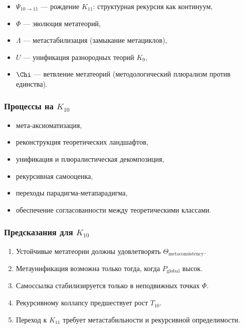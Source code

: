 \begin{itemize}
    \item $\Psi_{10\to11}$ — рождение $K_{11}$: структурная рекурсия как континуум,
    \item $\Phi$ — эволюция метатеорий,
    \item $\Lambda$ — метастабилизация (замыкание метациклов),
    \item $U$ — унификация разнородных теорий $K_9$,
    \item $\Chi$ — ветвление метатеорий (методологический плюрализм против единства).
\end{itemize}

\subsubsection{Процессы на $K_{10}$}

\begin{itemize}
    \item мета-аксиоматизация,
    \item реконструкция теоретических ландшафтов,
    \item унификация и плюралистическая декомпозиция,
    \item рекурсивная самооценка,
    \item переходы парадигма-метапарадигма,
    \item обеспечение согласованности между теоретическими классами.
\end{itemize}

\subsubsection{Предсказания для $K_{10}$}

\begin{enumerate}
    \item Устойчивые метатеории должны удовлетворять $\Theta_{\mathrm{metaconsistency}}$.
    \item Метаунификация возможна только тогда, когда $P_{\mathrm{global}}$ высок.
    \item Самоссылка стабилизируется только в неподвижных точках $\Phi$.
    \item Рекурсивному коллапсу предшествует рост $T_{10}$.
    \item Переход к $K_{11}$ требует метастабильности и рекурсивной определимости.
\end{enumerate}

